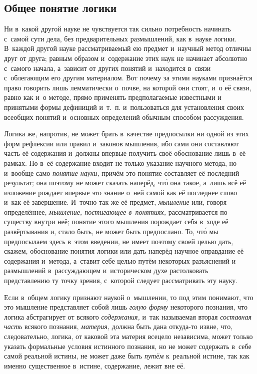 \subsection[Общее понятие логики]{Общее понятие логики}
Ни в~какой другой науке не чувствуется так
сильно потребность начинать с~самой сути дела, без предварительных
размышлений, как в~науке логики. В~каждой другой науке рассматриваемый ею
предмет и~научный метод отличны друг от друга; равным образом и~содержание
этих наук не начинает абсолютно с~самого начала, а~зависит от других
понятий и~находится в~связи с~облегающим его другим материалом. Вот почему за этими
науками признаётся право говорить лишь
лемматически о~почве, на которой они стоят, и~о её связи, равно как и~о
методе, прямо применять предполагаемые известными и
принятыми формы дефиниций и~т.~п. и~пользоваться для установления своих
всеобщих понятий и~основных определений обычным способом рассуждения.

Логика же, напротив, не может брать в~качестве предпосылки ни одной из этих
форм рефлексии или правил и~законов мышления, ибо сами они составляют часть
её содержания и~должны впервые получить своё обоснование лишь в~её рамках.
Но в~её содержание входит не только указание научного метода, но и~вообще
само {\em понятие науки,} причём это понятие
составляет её последний результат; она поэтому не может сказать наперёд,
чт\'{о} она такое, а~лишь всё её изложение рождает впервые это знание о~ней
самой как её последнее слово и~как её завершение. И~точно так же её
предмет, {\em мышление} или, говоря определённее,
{\em мышление, постигающее в~понятиях,} рассматривается
по существу внутри неё; понятие этого мышления порождает себя в~ходе её
развёртывания и, стало быть, не может быть предпослано. То, чт\'{о} мы
предпосылаем здесь в~этом введении, не имеет поэтому своей целью дать,
скажем, обоснование понятия логики или дать наперёд научное оправдание её
содержания и~метода, а~ставит себе целью путём некоторых разъяснений и
размышлений в~рассуждающем и~историческом духе растолковать представлению
ту точку зрения, с~которой следует рассматривать эту науку.

Если в~общем логику признают наукой о~мышлении, то под этим понимают, что
это мышление представляет собой лишь {\em голую форму}
некоторого познания, что логика абстрагирует от всякого
{\em содержания,} и~так называемая вторая
{\em составная часть} всякого познания,
{\em материя,} должна быть дана откуда-то извне, что,
следовательно, логика, от каковой эта материя всецело независима, может
только указать формальные условия истинного познания, но не может содержать
в~себе самой реальной истины, не может даже быть
{\em путём} к~реальной истине, так как именно
существенное в~истине, содержание, лежит вне её.


